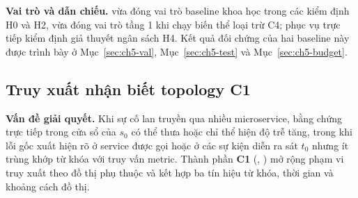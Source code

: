\textbf{Vai trò và dẫn chiếu.}  vừa đóng vai trò baseline khoa học trong các kiểm định H0 và H2, vừa đóng vai trò tầng 1 khi chạy biến thể loại trừ C4;  phục vụ trực tiếp kiểm định giả thuyết ngân sách H4. Kết quả đối chứng của hai baseline này được trình bày ở Mục~\ref{sec:ch5-val}, Mục~\ref{sec:ch5-test} và Mục~\ref{sec:ch5-budget}.

\subsection{Truy xuất nhận biết topology C1}
\label{sec:ch4-c1}

\textbf{Vấn đề giải quyết.} Khi sự cố lan truyền qua nhiều microservice, bằng chứng trực tiếp trong cửa sổ của $s_0$ có thể thưa hoặc chỉ thể hiện độ trễ tăng, trong khi lỗi gốc xuất hiện rõ ở service được gọi hoặc ở các sự kiện diễn ra sát $t_0$ nhưng ít trùng khớp từ khóa với truy vấn metric. Thành phần \textbf{C1} (, ) mở rộng phạm vi truy xuất theo đồ thị phụ thuộc và kết hợp ba tín hiệu từ khóa, thời gian và khoảng cách đồ thị.

